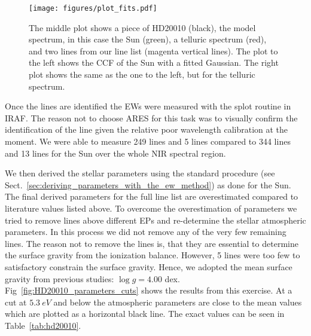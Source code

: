 \documentclass{aa}
\begin{document}
\begin{figure}[tbp!]
    \centering
    \texttt{[image: figures/plot\_fits.pdf]}
    \caption{The middle plot shows a piece of HD20010 (black), the model
    spectrum, in this case the Sun (green), a telluric spectrum (red), and two
    lines from our line list (magenta vertical lines). The plot to the left
    shows the CCF of the Sun with a fitted Gaussian. The right plot shows the
    same as the one to the left, but for the telluric spectrum.}
    \label{fig:plot_fits}
\end{figure}

Once the lines are identified the EWs were measured with the splot
routine in IRAF. The reason not to choose ARES for this task was to
visually confirm the identification of the line given the relative
poor wavelength calibration at the moment. We were able to measure 249
 lines and 5  lines compared to 344 
lines and 13  lines for the Sun over the whole NIR spectral
region.

We then derived the stellar parameters using the standard procedure
(see Sect.~\ref{sec:deriving_parameters_with_the_ew_method}) as
done for the Sun. The final derived parameters for the full line
list are overestimated compared to literature values listed above.
To overcome the overestimation of parameters we
tried to remove lines above different EPs and re-determine the stellar
atmospheric parameters. In this process we did not remove any of the
very few remaining  lines. The reason not to remove the
 lines is, that they are essential to determine the surface
gravity from the ionization balance. However, 5 lines were too few to
satisfactory constrain the surface gravity. Hence, we adopted the mean
surface gravity from previous studies: $\log g = 4.00$ dex.
Fig~\ref{fig:HD20010_parameters_cuts} shows the results from this
exercise. At a cut at $\SI{5.3}{eV}$ and below the atmospheric
parameters are close to the mean values
which are plotted as a horizontal black line. The exact values can be
seen in Table~\ref{tab:hd20010}.
\end{document}
